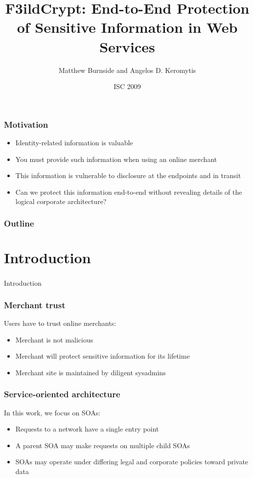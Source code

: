 \documentclass{beamer}
\title[F3ildCrypt]{F3ildCrypt: End-to-End Protection of Sensitive Information
in Web Services}
\author[Burnside, Keromytis]{Matthew Burnside and Angelos D. Keromytis}
\institute[Columbia University]{
Department of Computer Science\\
Columbia University\\
\texttt{\{mb, angelos\}@cs.columbia.edu}
}
\date{ISC 2009}
\begin{document}
\begin{frame}[plain]
    \titlepage
\end{frame}

\begin{frame}
\frametitle{Motivation}
\begin{itemize}
\item Identity-related information is valuable
\item You must provide such information when using an online merchant
\item This information is vulnerable to disclosure at the endpoints and in
transit 
\item Can we protect this information end-to-end without revealing details of
the logical corporate architecture?
\end{itemize}
\end{frame}

\begin{frame}
\frametitle{Outline}
\tableofcontents
\end{frame}

\section{Introduction}
\begin{frame}
\frametitle{}
\begin{center}
\Large{Introduction}
\end{center}
\end{frame}

\begin{frame}
\frametitle{Merchant trust}
Users have to trust online merchants:
\smallskip
\begin{itemize}
\item Merchant is not malicious
\item Merchant will protect sensitive information for its lifetime
\item Merchant site is maintained by diligent sysadmins
\end{itemize}
\end{frame}

\begin{frame}
\frametitle{Service-oriented architecture}
In this work, we focus on SOAs:
\smallskip
\begin{itemize}
\item Requests to a network have a single entry point
\item A parent SOA may make requests on multiple child SOAs 
\item SOAs may operate under differing legal and corporate policies toward
private data
\end{itemize}
\end{frame}
\end{document}
